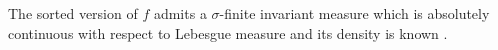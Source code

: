 The sorted version of $f$ admits a $\sigma$-finite invariant measure which is
absolutely continuous with respect to Lebesgue measure and its density is
known \cite{schweiger}.
